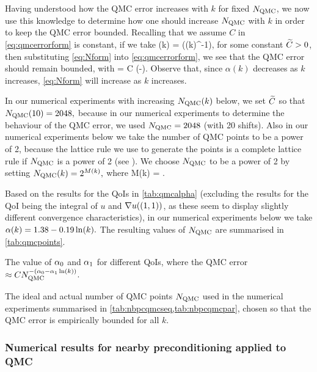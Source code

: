 Having understood how the QMC error increases with $k$ for fixed $N_{\mathrm{QMC}}$, we now use this knowledge to determine how one should increase $N_{\mathrm{QMC}}$ with $k$ in order to keep the QMC error bounded. Recalling that we assume $C$ in \cref{eq:qmcerrorform} is constant, if we take
\beq\label{eq:Nform}
\NQMC(k) = \exp\mleft(\Ctilde \alpha(k)^{-1}\mright),
\eeq
for some constant $\widetilde{C} > 0$, then substituting \cref{eq:Nform} into \cref{eq:qmcerrorform}, we see that the QMC error should remain bounded, with
\beqs
{} = C \exp\mleft(-\Ctilde\mright).
\eeqs
Observe that, since $\alpha(k)$ decreases as $k$ increases, \cref{eq:Nform} will increase as $k$ increases.

In our numerical experiments with increasing $N_{\mathrm{QMC}}(k)$ below, we set $\widetilde{C}$ so that $N_{\mathrm{QMC}}(10) = 2048,$ because in our numerical experiments to determine the behaviour of the QMC error, we used $N_{\mathrm{QMC}} = 2048$ (with 20 shifts). Also in our numerical experiments below we take the number of QMC points to be a power of 2, because the lattice rule we use to generate the points is a complete lattice rule if $N_{\mathrm{QMC}}$ is a power of 2 (see \cite{NuREADME}). We choose $N_{\mathrm{QMC}}$ to be a power of 2 by setting $N_{\mathrm{QMC}}(k) = 2^{M(k)},$ where
\beqs
M(k) = .
\eeqs

Based on the results for the QoIs in \cref{tab:qmcalpha} (excluding the results for the QoI being the integral of $u$ and $\nabla u((1,1))$, as these seem to display slightly different convergence characteristics), in our numerical experiments below we take $\alpha(k) = 1.38 - 0.19  \operatorname{ln}(k).$ The resulting values of $N_{\mathrm{QMC}}$ are summarised in \cref{tab:qmcpoints}.

\begin{table}[h!]
  \centering
  
  \caption{The value of $\alpha_{0}$ and $\alpha_{1}$ for different QoIs, where the QMC error $\approx C \NQMC^{-\mleft(\alphaz - \alphao\loge(k)\mright)}$.}\label{tab:qmcalpha}
  \end{table}


\begin{table}[h]
  \centering
  
  \caption{The ideal and actual number of QMC points $N_{\mathrm{QMC}}$ used in the numerical experiments summarised in \cref{tab:nbpcqmcseq,tab:nbpcqmcpar}, chosen so that the QMC error is empirically bounded for all $k$.\label{tab:qmcpoints}}
  \end{table}

\subsubsection{Numerical results for nearby preconditioning applied to QMC}

